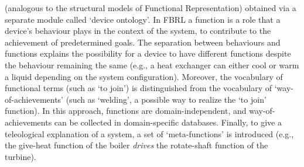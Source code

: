 \documentclass[
]{ceurart}
\begin{document}
\begin{itemize}
    (analogous to the structural models of Functional Representation) obtained via a separate module called `device ontology'. %
    In FBRL a function is a role that a device's behaviour plays in the context of the system, to contribute to the achievement of predetermined goals. The separation between behaviours and functions explains the possibility for a device to have different functions despite the behaviour remaining the same (e.g., a heat exchanger can either cool or warm a liquid depending on the system configuration). Moreover, the vocabulary of functional terms (such as `to join') is distinguished from the vocabulary of `way-of-achievements' (such as `welding', a possible way to realize the `to join' function). 
    In this approach, functions are domain-independent, and way-of-achievements can be collected in domain-specific databases.
    Finally, to give a teleological explanation of a system, a set of `meta-functions' is introduced (e.g., the give-heat function of the boiler \textit{drives} the rotate-shaft function of the turbine). 
\end{itemize}
\end{document}
